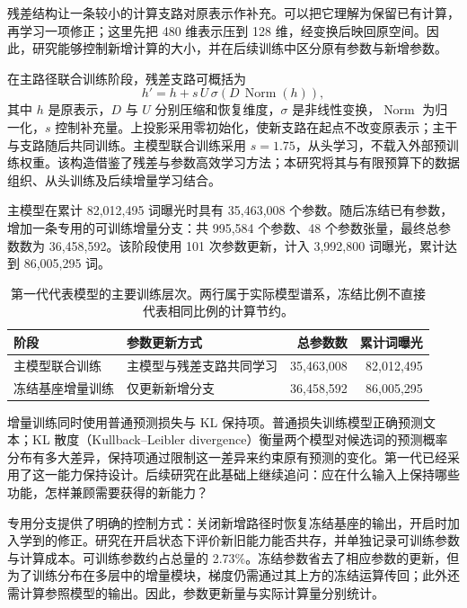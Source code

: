 残差结构让一条较小的计算支路对原表示作补充。可以把它理解为保留已有计算，再学习一项修正；这里先把 480 维表示压到 128 维，经变换后映回原空间。因此，研究能够控制新增计算的大小，并在后续训练中区分原有参数与新增参数。

在主路径联合训练阶段，残差支路可概括为
\begin{equation}
 h'=h+s\,U\,\sigma\!\left(D\,\operatorname{Norm}(h)\right),
\label{eq:residual}
\end{equation}
其中 $h$ 是原表示，$D$ 与 $U$ 分别压缩和恢复维度，$\sigma$ 是非线性变换，$\operatorname{Norm}$ 为归一化，$s$ 控制补充量。上投影采用零初始化，使新支路在起点不改变原表示；主干与支路随后共同训练。主模型联合训练采用 $s=1.75$，从头学习，不载入外部预训练权重。该构造借鉴了残差与参数高效学习方法\citep{bachlechner2021rezero,houlsby2019adapters}；本研究将其与有限预算下的数据组织、从头训练及后续增量学习结合。

主模型在累计 82,012,495 词曝光时具有 35,463,008 个参数。随后冻结已有参数，增加一条专用的可训练增量分支：共 995,584 个参数、48 个参数张量，最终总参数数为 36,458,592。该阶段使用 101 次参数更新，计入 3,992,800 词曝光，累计达到 86,005,295 词。

\begin{table}[htbp]
\caption{第一代代表模型的主要训练层次。两行属于实际模型谱系，冻结比例不直接代表相同比例的计算节约。}
\label{tab:lineage}
\small
\begin{tabularx}{\linewidth}{@{}P{32mm}Yrr@{}}
\toprule 阶段 & 参数更新方式 & 总参数数 & 累计词曝光\\\midrule
主模型联合训练 & 主模型与残差支路共同学习 & 35,463,008 & 82,012,495\\
冻结基座增量训练 & 仅更新新增分支 & 36,458,592 & 86,005,295\\
\bottomrule
\end{tabularx}
\end{table}

增量训练同时使用普通预测损失与 KL 保持项。普通损失训练模型正确预测文本；KL 散度（Kullback--Leibler divergence）衡量两个模型对候选词的预测概率分布有多大差异，保持项通过限制这一差异来约束原有预测的变化。第一代已经采用了这一能力保持设计。后续研究在此基础上继续追问：应在什么输入上保持哪些功能，怎样兼顾需要获得的新能力？

专用分支提供了明确的控制方式：关闭新增路径时恢复冻结基座的输出，开启时加入学到的修正。研究在开启状态下评价新旧能力能否共存，并单独记录可训练参数与计算成本。可训练参数约占总量的 2.73\%。冻结参数省去了相应参数的更新，但为了训练分布在多层中的增量模块，梯度仍需通过其上方的冻结运算传回；此外还需计算参照模型的输出。因此，参数更新量与实际计算量分别统计。

